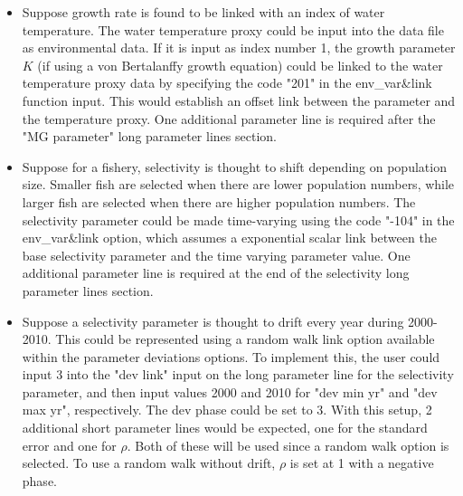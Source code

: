 \begin{itemize}
	\item Suppose growth rate is found to be linked with an index of water temperature. The water temperature proxy could be input into the data file as environmental data. If it is input as index number 1, the growth parameter $K$ (if using a von Bertalanffy growth equation) could be linked to the water temperature proxy data by specifying the code "201" in the env\_var\&link function input. This would establish an offset link between the parameter and the temperature proxy. One additional parameter line is required after the "MG parameter" long parameter lines section.
	\item Suppose for a fishery, selectivity is thought to shift depending on population size. Smaller fish are selected when there are lower population numbers, while larger fish are selected when there are higher population numbers. The selectivity parameter could be made time-varying using the code "-104" in the env\_var\&link option, which assumes a exponential scalar link between the base selectivity parameter and the time varying parameter value. One additional parameter line is required at the end of the selectivity long parameter lines section.
\end{itemize}


\begin{itemize}
	\item Suppose a selectivity parameter is thought to drift every year during 2000-2010. This could be represented using a random walk link option available within the parameter deviations options. To implement this, the user could input 3 into the "dev link" input on the long parameter line for the selectivity parameter, and then input values 2000 and 2010 for "dev min yr" and "dev max yr", respectively. The dev phase could be set to 3. With this setup, 2 additional short parameter lines would be expected, one for the standard error and one for $\rho$. Both of these will be used since a random walk option is selected. To use a random walk without drift, $\rho$ is set at 1 with a negative phase.
\end{itemize}


